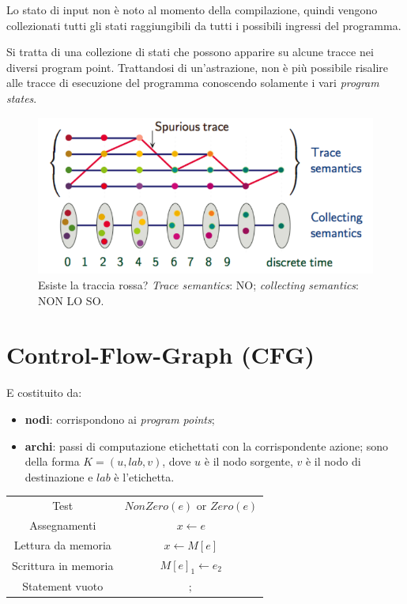\documentclass[a4paper, 10pt]{book}
\begin{document}
Lo stato di input non è noto al momento della compilazione, quindi vengono collezionati tutti gli stati raggiungibili da tutti i possibili ingressi del programma.
\newline

Si tratta di una collezione di stati che possono apparire su alcune tracce nei diversi program point. Trattandosi di un'astrazione, non è più possibile risalire alle tracce di esecuzione del programma conoscendo solamente i vari \textit{program states}.
\begin{figure}[H]
	\centering
	\includegraphics[scale=0.32]{pngs/TraceCollect}
	\caption{Esiste la traccia rossa? \textit{Trace semantics}: NO; \textit{collecting semantics}: NON LO SO.}
\end{figure}



\section{Control-Flow-Graph (CFG)}
E costituito da:
\begin{itemize}
	\item \textbf{nodi}: corrispondono ai \textit{program points};
	\item \textbf{archi}: passi di computazione etichettati con la corrispondente azione; sono della forma $K=(u, lab, v)$, dove $u$ è il nodo sorgente, $v$ è il nodo di destinazione e $lab$ è l'etichetta.
\end{itemize}	
\begin{center}
	\begin{tabular}{cc}
		\hline
		Test & $NonZero(e)$ or $Zero(e)$ \\
		Assegnamenti & $x \leftarrow e$ \\
		Lettura da memoria & $x \leftarrow M[e]$ \\
		Scrittura in memoria & $M[e]_1 \leftarrow e_2$ \\
		Statement vuoto & $;$ \\
		\hline
	\end{tabular}
\end{center}
\end{document}
